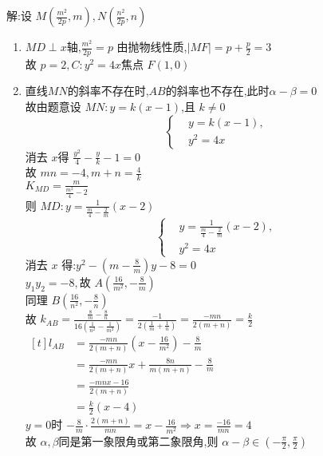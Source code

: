 \documentclass[class=ctexart,crop=false]{standalone}
\begin{document}
解:设 $M(\frac{m^2}{2p},m),N(\frac{n^2}{2p},n)$
\begin{enumerate}[label=(\arabic*)]
    \item $MD\perp x$轴,$\frac{m^2}{2p}=p$ 由抛物线性质,$|MF|=p+\frac{p}{2}=3$\\
            故 $p=2,C:y^2=4x$焦点 $F(1,0)$ 
    \item   直线$MN$的斜率不存在时,$AB$的斜率也不存在,此时$\alpha-\beta=0$\\
            故由题意设 $MN:y=k(x-1)$,且 $k\neq 0$
            $$\left\{\begin{aligned}
            &y=k(x-1)  , \\ 
            &y^2=4x  
            \end{aligned}\right.$$
            消去 $x$得 $\frac{y^2}{4}-\frac{y}{k}-1=0$\\
            故 $mn=-4,m+n=\frac{4}{k}$\\
            $K_{MD}=\frac{m}{\frac{m^2}{4}-2}$\\
            则 $MD:y=\frac{1}{\frac{m}{4}-\frac{2}{m}}(x-2)$
            $$ \left\{\begin{aligned}
             &y=\frac{1}{\frac{m}{4}-\frac{2}{m}}(x-2) , \\ 
             &y^2=4x 
            \end{aligned}\right.$$
            消去 $x$ 得:$y^2-(m-\frac{8}{m})y-8=0$\\
            $y_1y_2=-8,$故 $A(\frac{16}{m^2},-\frac{8}{m})$\\
            同理 $B(\frac{16}{n^2},-\frac{8}{n})$\\
            故 $k_{AB}=\frac{\frac{8}{m}-\frac{8}{n}}{16(\frac{1}{n^2}-\frac{1}{m^2})}
            =\frac{-1}{2(\frac{1}{m}+\frac{1}{n})}=\frac{-mn}{2(m+n)}=\frac{k}{2}$\\
            $\begin{aligned}[t]
                l_{AB}&=\frac{-mn}{2(m+n)}(x-\frac{16}{m^2})-\frac{8}{m}\\
                &=\frac{-mn}{2(m+n)}x+\frac{8n}{m(m+n)}-\frac{8}{m}\\
                &=\frac{-mnx-16}{2(m+n)}\\
                &=\frac{k}{2}(x-4)
            \end{aligned}$\\
            $y=0$时 $-\frac{8}{m}\cdot\frac{2(m+n)}{mn}=x-\frac{16}{m^2}\Rightarrow x=\frac{-16}{mn}=4$\\
            故  $\alpha,\beta$同是第一象限角或第二象限角,则 $\alpha-\beta\in (-\frac{\pi}{2},\frac{\pi}{2})$\\

\end{enumerate}
\end{document}
